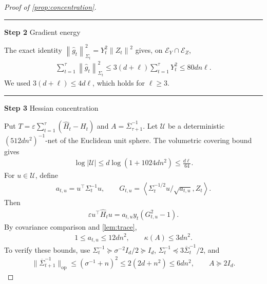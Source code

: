 \documentclass[11pt]{article}
\newcommand{\proofstep}[2]{%
    \par\medskip
    \noindent
    \textcolor{blue!55!black}{\rule{2pt}{1.2em}}%
    \hspace{0.6em}%
    {\sffamily\bfseries\color{blue!55!black}Step #1}%
    \quad
    {\sffamily #2}%
    \par\smallskip
}
\newcommand{\op}{\mathrm{op}}
\newcommand{\1}{\mathbf 1}
\newcommand{\eps}{\varepsilon}
\newcommand{\ip}[2]{\left\langle #1,#2\right\rangle}
\newcommand{\norm}[1]{\left\lVert #1\right\rVert}
\newcommand{\normm}[2]{\left\lVert #1\right\rVert_{#2}}
\begin{document}
\begin{proof}[Proof of \cref{prop:concentration}]
    \proofstep{2}{Gradient energy}
    The exact identity
    $\normm{\widehat g_t}{\Sigma_t}^2=Y_t^2\norm{Z_t}^2$
    gives, on $\mathcal E_Y\cap\mathcal E_Z$,
    \begin{align}
        \sum_{t=1}^\tau\normm{\widehat g_t}{\Sigma_t}^2
        \leq3(d+\ell)\sum_{t=1}^\tau Y_t^2
        \leq80dn\ell.
    \end{align}
    We used $3(d+\ell)\leq4d\ell$, which holds for $\ell\geq3$.

    \proofstep{3}{Hessian concentration}
    Put $T=\eps\sum_{t=1}^\tau(\widehat H_t-H_t)$ and
    $A=\overline\Sigma_{\tau+1}^{-1}$. Let $\mathcal U$ be a deterministic
    $(512dn^2)^{-1}$-net of the Euclidean unit sphere. The volumetric
    covering bound gives
    \begin{align}
        \log|\mathcal U|
        \leq d\log(1+1024dn^2)\leq\frac{d\ell}{64}.
        \label{eq:H-net-size}
    \end{align}
    For $u\in\mathcal U$, define
    \begin{align}
        a_{t,u}=u^\top\Sigma_t^{-1}u,
        \qquad
        G_{t,u}=
        \ip{\Sigma_t^{-1/2}u/\sqrt{a_{t,u}}}{Z_t}.
        \label{eq:H-standardisation}
    \end{align}
    Then
    \begin{align}
        \eps u^\top\widehat H_tu
        =a_{t,u}y_t(G_{t,u}^2-1).
        \label{eq:H-direction}
    \end{align}
    By covariance comparison and \cref{lem:trace},
    \begin{align}
        1\leq a_{t,u}\leq12dn^2,
        \qquad
        \kappa(A)\leq3dn^2.
        \label{eq:concentration-spectrum}
    \end{align}
    To verify these bounds, use
    $\Sigma_t^{-1}\succeq\sigma^{-2}I_d/2\succeq I_d$,
    $\Sigma_t^{-1}\preceq3\overline\Sigma_t^{-1}/2$, and
    \begin{align}
        \|\overline\Sigma_{t+1}^{-1}\|_{\op}
        \leq(\sigma^{-1}+n)^2
        \leq2(2d+n^2)\leq6dn^2,
        \qquad A\succeq2I_d.
    \end{align}


\end{proof}
\end{document}
